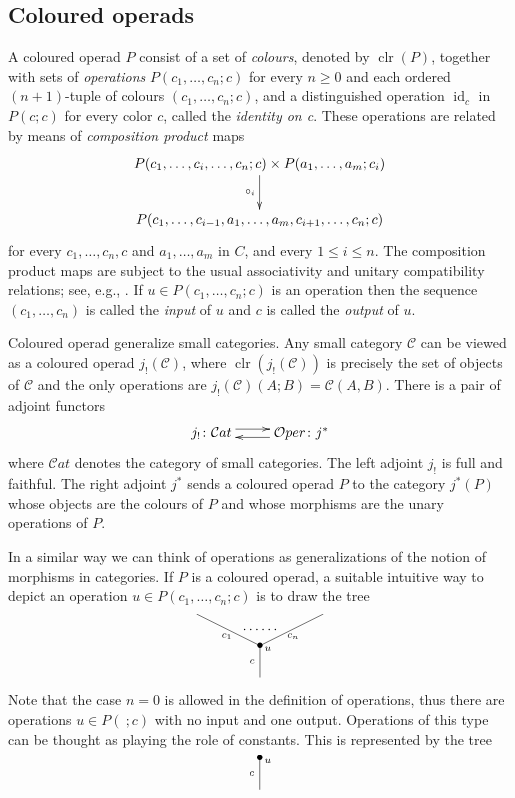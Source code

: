 \documentclass[a4paper]{amsart}
\theoremstyle{plain}
\theoremstyle{definition}
\theoremstyle{remark}
\DeclareMathOperator{\clr}{clr}
\DeclareMathOperator{\id}{id}
\newcommand{\Oper}{\mathcal{O}per}
\numberwithin{equation}{section}
\numberwithin{figure}{section}
\begin{document}
\subsection{Coloured operads}
A coloured operad $P$ consist of a set of \emph{colours}, denoted by
$\clr(P)$, together with sets of \emph{operations}
$P(c_1,\ldots,c_n;c)$ for every $n\ge 0$ and each ordered
$(n+1)$-tuple of colours $(c_1,\ldots, c_n; c)$, and a distinguished
operation $\id_c$ in $P(c;c)$ for every color $c$, called the
\emph{identity on c}. These operations are related by means of
\emph{composition product} maps
$$
    \xymatrix{P(c_1,\ldots, c_i,\ldots,c_n;c)\times P(a_1,\ldots,a_m;c_i)\ar[d]_-{\circ_i}\\
    P(c_1,\ldots, c_{i-1},a_1,\ldots,a_m,c_{i+1},\ldots,c_n;c)}
$$
for every $c_1, \ldots, c_n, c$ and $a_1,\ldots, a_m$ in $C$, and every $1\leq i\leq n$. The composition product
maps are subject to the usual associativity and unitary compatibility relations; see, e.g., \cite{leinster}.
If $u\in P(c_1,\ldots,c_n;c)$ is an operation then the sequence $(c_1,\ldots,c_n)$ is called the
\emph{input} of $u$ and $c$ is called the \emph{output} of $u$.

Coloured operad generalize small categories. Any small category
$\mathcal{C}$ can be viewed as a coloured operad
$j_!(\mathcal{C})$, where $\clr(j_!(\mathcal{C}))$
is precisely the set of objects of $\mathcal{C}$ and the only
operations are $j_!(\mathcal C)(A;B)=\mathcal{C}(A,B)$. There is a pair of
adjoint functors
$$
    \xymatrix{
        j_!\colon \mathcal{C}at \ar@<3pt>[r] & \ar@<3pt>[l] \Oper\colon j^*
    }
$$
where $\mathcal{C}at$ denotes the category of small categories. The left
adjoint $j_!$ is full and faithful. The right adjoint $j^*$ sends a
coloured operad $P$ to the category $j^*(P)$ whose objects are the
colours of $P$ and whose morphisms are the unary operations of $P$.

In a similar way we can think of operations as generalizations of the
notion of morphisms in categories. If $P$ is a coloured
operad, a suitable intuitive way to depict an operation
$u\in P(c_1,\ldots, c_n;c)$ is to draw the tree
$$
    \xy<0.08cm, 0cm>:
    (0,0)*{}="1";
    (0,10)*=0{\bullet}="2";
    (-20,20)*{}="3";
    (20,20)*{}="4";
    "1";"2" **\dir{-};
    "2";"3" **\dir{-};
    "2";"4" **\dir{-};
    (-2.5,5)*=0{\scriptstyle c};
    (-10.5, 13)*=0{\scriptstyle c_1};
    (10.5, 13)*=0{\scriptstyle c_n};
    (2.5, 9)*=0{\scriptstyle u};
    (0, 15)*=0{\cdots\cdots};
    \endxy
$$
Note that the case $n=0$ is allowed in the definition of operations,
thus there are operations $u\in P(\ ;c)$ with no input and one
output. Operations of this type can be thought as playing the role
of constants. This is represented by the tree
$$
    \xy<0.08cm, 0cm>:
    (0,0)*{}="1";
    (0,10)*=0{\bullet}="2";
    "1";"2" **\dir{-};
    (-2.5,5)*=0{\scriptstyle c};
    (2.5, 9)*=0{\scriptstyle u};
    \endxy
$$
\end{document}
